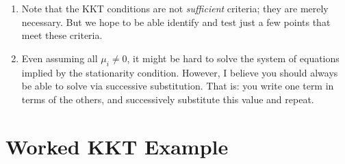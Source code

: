 \documentclass[11pt, oneside]{amsart}
\begin{document}
\begin{enumerate}
  \item Note that the KKT conditions are not \emph{sufficient} criteria;
  they are merely necessary. But we hope to be able identify and test
  just a few points that meet these criteria.

  \item Even assuming all $\mu_i \ne 0$, it might be hard to solve the
  system of equations implied by the stationarity condition. However, I
  believe you should always be able to solve via successive
  substitution. That is: you write one term in terms of the others, and
  successively substitute this value and repeat.
\end{enumerate}

\section{Worked KKT Example}
\end{document}
